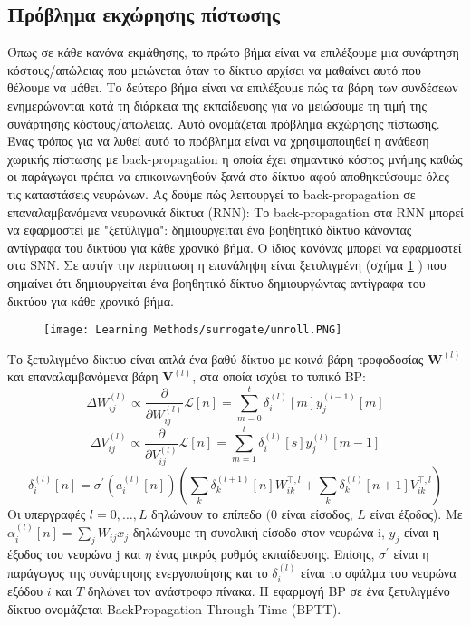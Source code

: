 \documentclass[12pt]{report}
\begin{document}
\subsection{Πρόβλημα εκχώρησης πίστωσης}
Όπως σε κάθε κανόνα εκμάθησης, το πρώτο βήμα είναι να επιλέξουμε μια συνάρτηση κόστους/απώλειας που μειώνεται όταν το δίκτυο αρχίσει να μαθαίνει αυτό που θέλουμε να μάθει. Το δεύτερο βήμα είναι να επιλέξουμε πώς τα βάρη των συνδέσεων ενημερώνονται κατά τη διάρκεια της εκπαίδευσης για να μειώσουμε τη τιμή της συνάρτησης κόστους/απώλειας. Αυτό ονομάζεται πρόβλημα εκχώρησης πίστωσης. Ένας τρόπος για να λυθεί αυτό το πρόβλημα είναι να χρησιμοποιηθεί η ανάθεση χωρικής πίστωσης με \textlatin{back-propagation} η οποία έχει σημαντικό κόστος μνήμης καθώς οι παράγωγοι πρέπει να επικοινωνηθούν ξανά στο δίκτυο αφού αποθηκεύσουμε όλες τις καταστάσεις νευρώνων. Ας δούμε πώς λειτουργεί το \textlatin{back-propagation} σε επαναλαμβανόμενα νευρωνικά δίκτυα (\textlatin{RNN}):
Το \textlatin{back-propagation} στα \textlatin{RNN} μπορεί να εφαρμοστεί με "ξετύλιγμα": δημιουργείται ένα βοηθητικό δίκτυο κάνοντας αντίγραφα του δικτύου για κάθε χρονικό βήμα. Ο ίδιος κανόνας μπορεί να εφαρμοστεί στα \textlatin{SNN}. Σε αυτήν την περίπτωση η επανάληψη είναι ξετυλιγμένη (σχήμα \ref{fig:unroll} ) που σημαίνει ότι δημιουργείται ένα βοηθητικό δίκτυο δημιουργώντας αντίγραφα του δικτύου για κάθε χρονικό βήμα.
\begin{figure}[htp]
    \centering
    \texttt{[image: Learning Methods/surrogate/unroll.PNG]}
    \caption{}
    \label{fig:unroll}
\end{figure}


Το ξετυλιγμένο δίκτυο είναι απλά ένα βαθύ δίκτυο με κοινά βάρη τροφοδοσίας $\mathbf{W}^{(l)}$ και επαναλαμβανόμενα βάρη $\mathbf{V}^{(l)}$, στα οποία ισχύει το τυπικό \textlatin{BP}:
\begin{equation}
\Delta W_{i j}^{(l)} \propto \frac{\partial}{\partial W_{i j}^{(l)}} \mathcal{L}[n]=\sum_{m=0}^{t} \delta_{i}^{(l)}[m] y_{j}^{(l-1)}[m]
\end{equation}
\begin{equation}
\Delta V_{i j}^{(l)} \propto \frac{\partial}{\partial V_{i j}^{(l)}} \mathcal{L}[n]=\sum_{m=1}^{t} \delta_{i}^{(l)}[s] y_{j}^{(l)}[m-1]
\end{equation}
\begin{equation}
\delta_{i}^{(l)}[n]=\sigma^{\prime}\left(a_{i}^{(l)}[n]\right)\left(\sum_{k} \delta_{k}^{(l+1)}[n] W_{i k}^{\top, l}+\sum_{k} \delta_{k}^{(l)}[n+1] V_{i k}^{\top, l}\right)
\end{equation}
Οι υπεργραφές $l=0, \ldots, L$ δηλώνουν το επίπεδο $(0$ είναι είσοδος, $L$ είναι έξοδος). Με $\alpha_{i}^{(l)}[n]=\sum_{j} W_{i j} x_{j}$ δηλώνουμε τη συνολική είσοδο στον νευρώνα \textlatin{i}, $y_{j}$ είναι η έξοδος του νευρώνα \textlatin{j} και $\eta$ ένας μικρός ρυθμός εκπαίδευσης. Επίσης, $\sigma^{\prime}$ είναι η παράγωγος της συνάρτησης ενεργοποίησης και το $\delta_{i}^{(l)}$ είναι το σφάλμα του νευρώνα εξόδου $i$ και $T$ δηλώνει τον ανάστροφο πίνακα. Η εφαρμογή \textlatin{BP} σε ένα ξετυλιγμένο δίκτυο ονομάζεται \textlatin{BackPropagation Through Time} (\textlatin{BPTT}).
\end{document}
